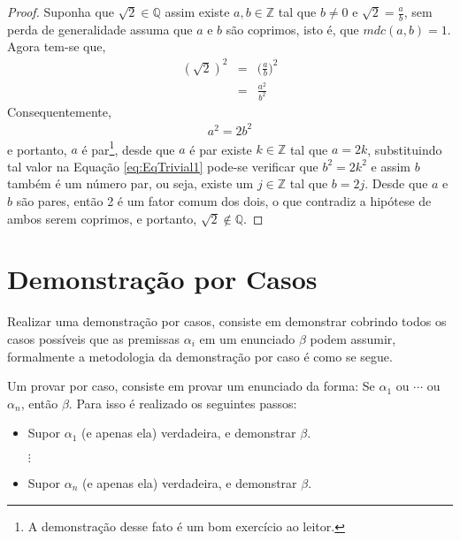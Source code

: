 \begin{exem}
	\begin{proof}
		Suponha que $\sqrt{2} \in \mathbb{Q}$ assim existe $a, b \in \mathbb{Z}$ tal que $b \neq 0$ e $\sqrt{2} = \frac{a}{b}$, sem perda de generalidade assuma que $a$ e $b$ são coprimos, isto é, que $mdc(a, b) = 1$. Agora tem-se que,
		\begin{eqnarray*}
			(\sqrt{2})^2 & = & \Big(\frac{a}{b}\Big)^2\\ 
			& = & \frac{a^2}{b^2}
		\end{eqnarray*}
		Consequentemente, 
		\begin{eqnarray}\label{eq:EqTrivial1}
			a^2 = 2b^2
		\end{eqnarray}
		e portanto, $a$ é par\footnote{A demonstração desse fato é um bom exercício ao leitor.}, desde que $a$ é par existe $k \in \mathbb{Z}$ tal que $a = 2k$, substituindo tal valor na Equação \ref{eq:EqTrivial1} pode-se verificar que $b^2 = 2k^2$ e assim $b$ também é um número par, ou seja, existe um $j \in \mathbb{Z}$ tal que $b = 2j$. Desde que $a$ e $b$ são pares, então 2 é um fator comum dos dois, o que contradiz a hipótese de ambos serem coprimos, e portanto, $\sqrt{2} \notin \mathbb{Q}$.
	\end{proof}
\end{exem}

\section{Demonstração por Casos}\label{sec:DemonstracaoPorCasos}

Realizar uma demonstração por casos, consiste em demonstrar cobrindo todos os casos possíveis que as premissas $\alpha_i$ em um enunciado $\beta$ podem assumir, formalmente a metodologia da demonstração por caso é como se segue.

\begin{method}\label{metodo:PorCasos}
	Um provar por caso, consiste em provar um enunciado da forma: Se $\alpha_1$ ou $\cdots$ ou $\alpha_n$, então $\beta$. Para isso é realizado os seguintes passos:
	\begin{itemize}
		\item Supor $\alpha_1$ (e apenas ela) verdadeira, e demonstrar $\beta$.
		
		$\vdots$
		
		\item Supor $\alpha_n$ (e apenas ela) verdadeira, e demonstrar $\beta$.
	\end{itemize}
\end{method} 

